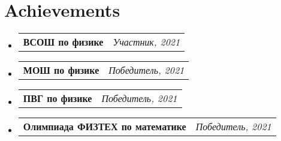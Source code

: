 \documentclass[a4paper,11pt]{article}
\makeatletter
\newcommand{\resumePOR}[3]{
\vspace{0.5mm}\item
    \begin{tabular*}{0.97\textwidth}[t]{l@{\extracolsep{\fill}}r}
        \textbf{#1}\hspace{0.3mm}#2 & \textit{\small{#3}} 
    \end{tabular*}
    \vspace{-2mm}
}
\newcommand{\resumeSubHeadingListStart}{\begin{itemize}[leftmargin=*,labelsep=0mm]}
\newcommand{\resumeSubHeadingListEnd}{\end{itemize}\vspace{2mm}}
\makeatother
\begin{document}




\section{\textbf{Achievements}}
\vspace{-0.4mm}
\resumeSubHeadingListStart
\resumePOR{ВСОШ по физике} %
    {} %
    {Участник, 2021} %
    
\resumePOR{МОШ по физике} %
    {} %
    {Победитель, 2021} %
    
\resumePOR{ПВГ по физике} %
    {} %
    {Победитель, 2021} %
    
\resumePOR{Олимпиада ФИЗТЕХ по математике} %
    {} %
    {Победитель, 2021} %
\resumeSubHeadingListEnd
\vspace{-5mm}



\end{document}
